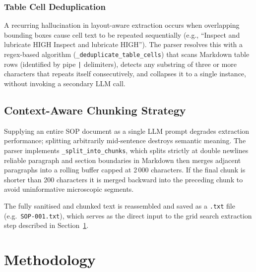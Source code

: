 ﻿\documentclass[11pt]{article}
\begin{document}
\subsubsection{Table Cell Deduplication}
A recurring hallucination in layout-aware extraction occurs when overlapping
bounding boxes cause cell text to be repeated sequentially
(e.g., ``Inspect and lubricate HIGH Inspect and lubricate HIGH'').
The parser resolves this with a regex-based algorithm
(\texttt{\_deduplicate\_table\_cells}) that scans Markdown table rows (identified
by pipe \texttt{|} delimiters), detects any substring of three or more characters
that repeats itself consecutively, and collapses it to a single instance, without
invoking a secondary LLM call.

\subsection{Context-Aware Chunking Strategy}
Supplying an entire SOP document as a single LLM prompt degrades extraction
performance; splitting arbitrarily mid-sentence destroys semantic meaning.
The parser implements \texttt{\_split\_into\_chunks}, which splits strictly at
double newlines reliable paragraph and section boundaries in Markdown then
merges adjacent paragraphs into a rolling buffer capped at 2\,000 characters.
If the final chunk is shorter than 200 characters it is merged backward into the
preceding chunk to avoid uninformative microscopic segments.

The fully sanitised and chunked text is reassembled and saved as a
\texttt{.txt} file (e.g.\ \texttt{SOP-001.txt}), which serves as the direct
input to the grid search extraction step described in Section~\ref{sec:evaluation}.

\section{Methodology}
\label{sec:evaluation}
\end{document}
